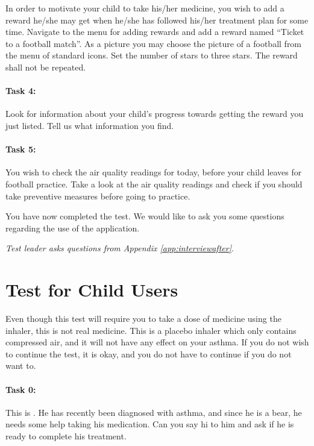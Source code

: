 In order to motivate your child to take his/her medicine, you wish to add a reward he/she may get when he/she has followed his/her treatment plan for some time. 
Navigate to the menu for adding rewards and add a reward named ``Ticket to a football match''. As a picture you may choose the picture of a football from the menu of standard icons. Set the number of stars to three stars. The reward shall not be repeated. 


\paragraph{Task 4:}

Look for information about your child's progress towards getting the reward you just listed. Tell us what information you find.

\paragraph{Task 5:}

You wish to check the air quality readings for today, before your child leaves for football practice. Take a look at the air quality readings and check if you should take preventive measures before going to practice.  

You have now completed the test. We would like to ask you some questions regarding the use of the application. 

\emph{Test leader asks questions from Appendix \ref{app:interviewafter}}.

\section{Test for Child Users}
\label{sec:childtest}

Even though this test will require you to take a dose of medicine using the inhaler, this is not real medicine. This is a placebo inhaler which only contains compressed air, and it will not have any effect on your asthma. If you do not wish to continue the test, it is okay, and you do not have to continue if you do not want to. 
 
\paragraph{Task 0:}

This is \ab{}. He has recently been diagnosed with asthma, and since he is a bear, he needs some help taking his medication. Can you say hi to him and ask if he is ready to complete his treatment. 

